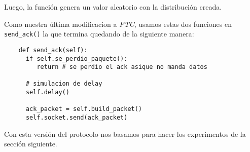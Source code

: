 Luego, la funci\'on  genera un valor aleatorio con la distribuci\'on creada.  

Como nuestra \'ultima modificacion a \emph{PTC}, usamos estas dos funciones en \texttt{send\_ack()} la que termina quedando de la siguiente manera:

\begin{verbatim}
    def send_ack(self):
      if self.se_perdio_paquete():
         return # se perdio el ack asique no manda datos

      # simulacion de delay
      self.delay()

      ack_packet = self.build_packet()
      self.socket.send(ack_packet)
\end{verbatim}

Con esta versi\'on del protocolo nos basamos para hacer los experimentos de la secci\'on siguiente. 
